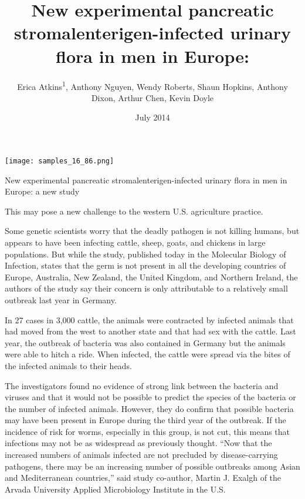 \documentclass{article}
\title{New experimental pancreatic stromalenterigen-infected urinary flora in men in Europe:}
\author{Erica Atkins\textsuperscript{1},  Anthony Nguyen,  Wendy Roberts,  Shaun Hopkins,  Anthony Dixon,  Arthur Chen,  Kevin Doyle}
\affil{\textsuperscript{1}Kurume University}
\date{July 2014}
\begin{document}
\maketitle

\begin{center}
\begin{minipage}{0.75\linewidth}
\texttt{[image: samples\_16\_86.png]}
\end{minipage}
\end{center}

New experimental pancreatic stromalenterigen-infected urinary flora in men in Europe: a new study

This may pose a new challenge to the western U.S. agriculture practice.

Some genetic scientists worry that the deadly pathogen is not killing humans, but appears to have been infecting cattle, sheep, goats, and chickens in large populations. But while the study, published today in the Molecular Biology of Infection, states that the germ is not present in all the developing countries of Europe, Australia, New Zealand, the United Kingdom, and Northern Ireland, the authors of the study say their concern is only attributable to a relatively small outbreak last year in Germany.

In 27 cases in 3,000 cattle, the animals were contracted by infected animals that had moved from the west to another state and that had sex with the cattle. Last year, the outbreak of bacteria was also contained in Germany but the animals were able to hitch a ride. When infected, the cattle were spread via the bites of the infected animals to their heads.

The investigators found no evidence of strong link between the bacteria and viruses and that it would not be possible to predict the species of the bacteria or the number of infected animals. However, they do confirm that possible bacteria may have been present in Europe during the third year of the outbreak. If the incidence of risk for worms, especially in this group, is not cut, this means that infections may not be as widespread as previously thought. “Now that the increased numbers of animals infected are not precluded by disease-carrying pathogens, there may be an increasing number of possible outbreaks among Asian and Mediterranean countries,” said study co-author, Martin J. Exalgh of the Arvada University Applied Microbiology Institute in the U.S.
\end{document}
